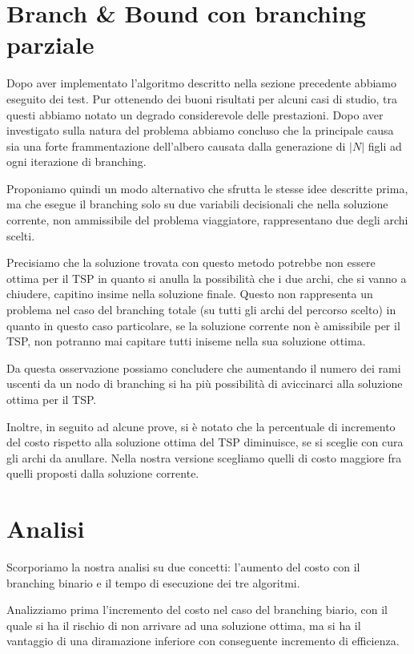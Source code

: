 \section{Branch \& Bound con branching parziale}
Dopo aver implementato l’algoritmo descritto nella sezione precedente abbiamo eseguito dei test. Pur ottenendo dei buoni risultati per alcuni casi di studio, tra questi abbiamo notato un degrado considerevole delle prestazioni. Dopo aver investigato sulla natura del problema abbiamo concluso che la principale causa sia una forte frammentazione dell’albero causata dalla generazione di \begin{math}|N| \end{math} figli ad ogni iterazione di branching. 

Proponiamo quindi un modo alternativo che sfrutta le stesse idee descritte prima, ma che esegue il branching solo su due variabili decisionali che nella soluzione corrente, non ammissibile del problema viaggiatore, rappresentano due degli archi scelti.

Precisiamo che la soluzione trovata con questo metodo potrebbe non essere ottima per il TSP in quanto si anulla la possibilità che i due archi, che si vanno a chiudere, capitino insime nella  soluzione finale. Questo non rappresenta un problema nel caso del branching totale (su tutti gli archi del percorso scelto) in quanto in questo caso particolare, se la soluzione corrente non è amissibile per il TSP, non potranno mai capitare tutti iniseme nella sua soluzione ottima. 

Da questa osservazione possiamo concludere che aumentando il numero dei rami uscenti da un nodo di branching si ha più possibilità di aviccinarci alla soluzione ottima per il TSP.

Inoltre, in seguito ad alcune prove, si è notato che la percentuale di incremento del costo rispetto alla soluzione ottima del TSP diminuisce, se si sceglie con cura gli archi da anullare. Nella nostra versione scegliamo quelli di costo maggiore fra quelli proposti dalla soluzione corrente. 

\section{Analisi}
Scorporiamo la nostra analisi su due concetti: l'aumento del costo con il branching binario e il tempo di esecuzione dei tre algoritmi.

Analizziamo prima l'incremento del costo nel caso del branching biario, con il quale si ha il rischio di non arrivare ad una soluzione ottima, ma si ha il vantaggio di una diramazione inferiore con conseguente incremento di efficienza.

